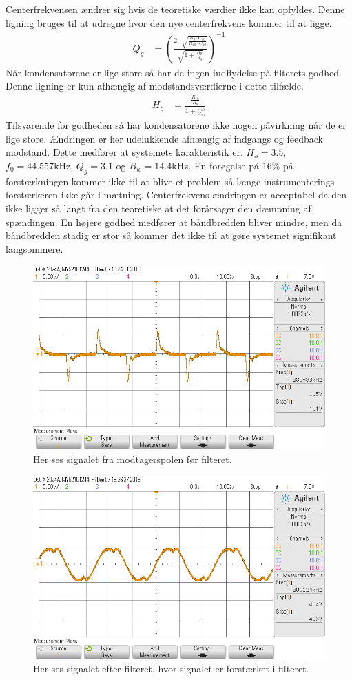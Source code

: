 Centerfrekvensen ændrer sig hvis de teoretiske værdier ikke kan opfyldes. Denne ligning bruges til at udregne hvor den nye centerfrekvens kommer til at ligge.
\begin{align}
	Q_g & = \left( \frac{2 \cdot \sqrt{\frac{R_9 \cdot C_{10}}{R_{10} \cdot C_{10}}}}{\sqrt{1+\frac{R_9}{R_8}}} \right)^{-1}
	\end{align}
Når kondensatorene er lige store så har de ingen indflydelse på filterets godhed. Denne ligning er kun afhængig af modstandsværdierne i dette tilfælde.
\begin{align}
	H_o & = \frac{\frac{R_{10}}{R_8}}{1+\frac{C_{10}}{C_{10}}}
\end{align}
Tilsvarende for godheden så har kondensatorene ikke nogen påvirkning når de er lige store.
Ændringen er her udelukkende afhængig af indgangs og feedback modstand.
Dette medfører at systemets karakteristik er. 
$H_o = 3.5$, $f_0 = 44.557 \si{\kilo\hertz}$, $Q_g = 3.1$ og $B_w = 14.4 \si{\kilo\hertz}$. 
En forøgelse på $16 \%$ på forstærkningen kommer ikke til at blive et problem så længe instrumenterings forstærkeren ikke går i mætning. 
Centerfrekvens ændringen er acceptabel da den ikke ligger så langt fra den teoretiske at det forårsager den dæmpning af spændingen.
En højere godhed medfører at båndbredden bliver mindre, men da båndbredden stadig er stor så kommer det ikke til at gøre systemet signifikant langsommere.
\begin{figure}[h!]
	\centering
	\includegraphics[width=1\textwidth]{billeder/filter_in_png.png}
	\caption{Her ses signalet fra modtagerspolen før filteret.}
	\label{fig:filter_in}
\end{figure}
\begin{figure}[h!]
	\centering
	\includegraphics[width=1\textwidth]{billeder/filter_out_png.png}
	\caption{Her ses signalet efter filteret, hvor signalet er forstærket i filteret.}
	\label{fig:filter_out}
\end{figure}
